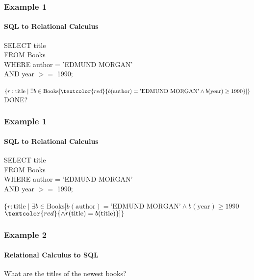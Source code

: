 \documentclass{beamer}
\begin{document}
\begin{frame}
  \frametitle{Example 1}
    \framesubtitle{SQL to Relational Calculus}
  SELECT title\\
  FROM Books\\
  WHERE author = 'EDMUND MORGAN'\\
  AND year $>=$ 1990;\\
  \hfill \\
  $\{r:\text{title} \mid \exists b \in \text{Books} [ \textcolor{red}{b(\text{author}) = \text{'EDMUND MORGAN'} \land b(\text{year}) \geq 1990} ] \}$\\
  DONE?
\end{frame}

\begin{frame}
  \frametitle{Example 1}
    \framesubtitle{SQL to Relational Calculus}
  SELECT title\\
  FROM Books\\
  WHERE author = 'EDMUND MORGAN'\\
  AND year $>=$ 1990;\\
  \hfill \\
  $\{r:\text{title} \mid \exists b \in \text{Books} [ b(\text{author}) = \text{'EDMUND MORGAN'} \land b(\text{year}) \geq 1990$\\
  $\textcolor{red}{\land r(\text{title}) = b(\text{title})}] \}$\\
\end{frame}

\begin{frame}
  \frametitle{Example 2}
    \framesubtitle{Relational Calculus to SQL}
  What are the titles of the newest books?\\
\end{frame}
\end{document}
